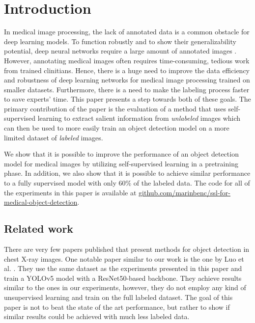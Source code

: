 \documentclass[conference]{IEEEtran}
\begin{document}
\section{Introduction}

In medical image processing, the lack of annotated data is a common obstacle for deep learning models. To function 
robustly and to show their generalizability potential, deep neural networks require a large 
amount of annotated images \cite{litjensSurveyDeepLearning2017}. However, 
annotating medical images often requires time-consuming, tedious work from trained clinitians. 
Hence, there is a huge need to improve the 
data efficiency and robustness of deep learning networks for medical image processing
trained on smaller datasets. Furthermore, 
there is a need to make the labeling process faster to save experts' time. This paper presents a 
step towards both of these goals. The primary contribution of the paper is the evaluation of a method 
that uses self-supervised learning 
to extract salient information from \textit{unlabeled} images which can then be used to more 
easily train an object detection model on a more limited dataset 
of \textit{labeled} images.

We show that it is possible to improve the performance of an object detection model
for medical images by utilizing self-supervised learning in a pretraining phase. In addition, we
also show that it is possible to achieve similar performance to a fully supervised model with
only 60\% of the labeled data. The code for all of the
experiments in this paper is available at \href{https://github.com/marinbenc/ssl-for-medical-object-detection}{github.com/marinbenc/ssl-for-medical-object-detection}.

\subsection{Related work}

There are very few papers published that present methods for object detection in 
chest X-ray images. One notable paper similar to our work is the one by Luo et al.
\cite{luoIntelligentSolutionsChest2021}. They use the same dataset as the experiments
presented in this paper and train a YOLOv5 model with a ResNet50-based backbone.
They achieve results similar to the ones in our experiments,
however, they do not employ any kind of unsupervised learning and train on the full labeled dataset. 
The goal of this paper
is not to beat the state of the art performance, but rather to show if similar results could
be achieved with much less labeled data.
\end{document}
